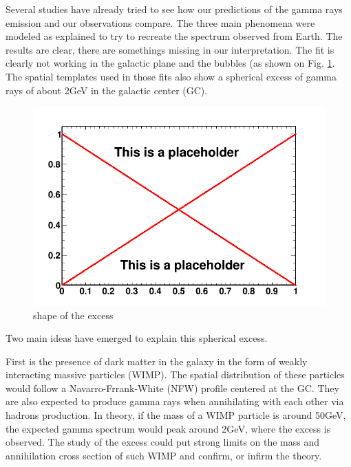 Several studies have already tried to see how our predictions of the gamma rays emission and our observations compare. The three main phenomena were modeled as explained to try to recreate the spectrum observed from Earth. The results are clear, there are somethings missing in our interpretation. 
The fit is clearly not working in the galactic plane and the bubbles (as shown on Fig. \ref{fig:first_BKGonly_fits}. The spatial templates used in those fits also show a spherical excess of gamma rays of about 2GeV in the galactic center (GC).

\begin{figure}
 \centering
 \includegraphics[width=.9\linewidth]{pic/dummy.png}
 \caption{shape of the excess}
 \label{fig:first_BKGonly_fits}
\end{figure}


Two main ideas have emerged to explain this spherical excess.

First is the presence of dark matter in the galaxy in the form of weakly interacting massive particles (WIMP). The spatial distribution of these particles would follow a Navarro-Frrank-White (NFW) profile centered at the GC. They are also expected to produce gamma rays when annihilating with each other via hadrons production. In theory, if the mass of a WIMP particle is around 50GeV, the expected gamma spectrum would peak around 2GeV, where the excess is observed. 
The study of the excess could put strong limits on the mass and annihilation cross section of such WIMP and confirm, or infirm the theory.

